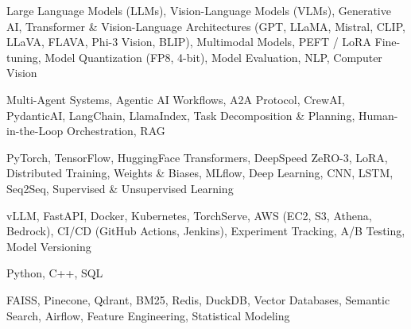 \documentclass[letter,10pt]{article}
\begin{document}
 Large Language Models (LLMs), Vision-Language Models (VLMs), Generative AI, Transformer \& Vision-Language Architectures (GPT, LLaMA, Mistral, CLIP, LLaVA, FLAVA, Phi-3 Vision, BLIP), Multimodal Models, PEFT / LoRA Fine-tuning, Model Quantization (FP8, 4-bit), Model Evaluation, NLP, Computer Vision\par\vspace{2pt}

 Multi-Agent Systems, Agentic AI Workflows, A2A Protocol, CrewAI, PydanticAI, LangChain, LlamaIndex, Task Decomposition \& Planning, Human-in-the-Loop Orchestration, RAG\par\vspace{2pt}

 PyTorch, TensorFlow, HuggingFace Transformers, DeepSpeed ZeRO-3, LoRA, Distributed Training, Weights \& Biases, MLflow, Deep Learning, CNN, LSTM, Seq2Seq, Supervised \& Unsupervised Learning\par\vspace{2pt}

 vLLM, FastAPI, Docker, Kubernetes, TorchServe, AWS (EC2, S3, Athena, Bedrock), CI/CD (GitHub Actions, Jenkins), Experiment Tracking, A/B Testing, Model Versioning\par\vspace{2pt}

 Python, C++, SQL\par\vspace{2pt}

 FAISS, Pinecone, Qdrant, BM25, Redis, DuckDB, Vector Databases, Semantic Search, Airflow, Feature Engineering, Statistical Modeling
\end{document}
